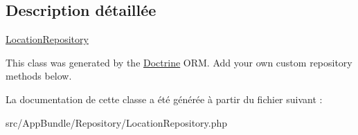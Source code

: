 \subsection{Description détaillée}
\hyperlink{classAppBundle_1_1Repository_1_1LocationRepository}{Location\+Repository}

This class was generated by the \hyperlink{namespaceAppBundle_1_1Doctrine}{Doctrine} O\+RM. Add your own custom repository methods below. 

La documentation de cette classe a été générée à partir du fichier suivant \+:\begin{DoxyCompactItemize}
\item 
src/\+App\+Bundle/\+Repository/Location\+Repository.\+php\end{DoxyCompactItemize}
